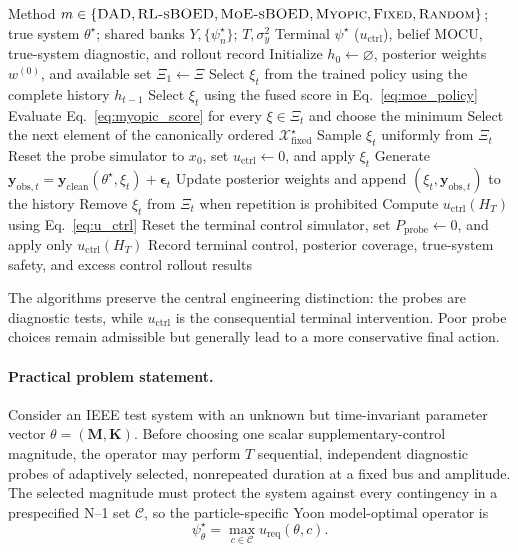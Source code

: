\documentclass[11pt]{article}
\begin{document}
\begin{algorithm}[htbp]
\caption{Unified rollout and evaluation for all six methods}
\label{alg:evaluation}
\begin{algorithmic}[1]
\Require Method \(m\in\{\textsc{DAD},\textsc{RL-sBOED},\textsc{MoE-sBOED},\textsc{Myopic},\textsc{Fixed},\textsc{Random}\}\); true system \(\theta^\star\); shared banks \(Y,\{\psi_n^\star\}\); \(T,\sigma_y^2\)
\Ensure Terminal \(\psi^\star\) (\(u_{\mathrm{ctrl}}\)), belief MOCU, true-system diagnostic, and rollout record
\State Initialize \(h_0\gets\varnothing\), posterior weights \(w^{(0)}\), and available set \(\Xi_1\gets\Xi\)
        \State Select \(\xi_t\) from the trained policy using the complete history \(h_{t-1}\)
        \State Select \(\xi_t\) using the fused score in Eq.~\eqref{eq:moe_policy}
        \State Evaluate Eq.~\eqref{eq:myopic_score} for every \(\xi\in\Xi_t\) and choose the minimum
        \State Select the next element of the canonically ordered \(\mathcal X_{\mathrm{fixed}}^{\star}\)
    \Else
        \State Sample \(\xi_t\) uniformly from \(\Xi_t\)
    \EndIf
    \State Reset the probe simulator to \(x_0\), set \(u_{\mathrm{ctrl}}\gets0\), and apply \(\xi_t\)
    \State Generate \(\mathbf y_{\mathrm{obs},t}=\mathbf y_{\mathrm{clean}}(\theta^\star,\xi_t)+\boldsymbol\epsilon_t\)
    \State Update posterior weights and append \((\xi_t,\mathbf y_{\mathrm{obs},t})\) to the history
    \State Remove \(\xi_t\) from \(\Xi_t\) when repetition is prohibited
\EndFor
\State Compute \(u_{\mathrm{ctrl}}(H_T)\) using Eq.~\eqref{eq:u_ctrl}
\State Reset the terminal control simulator, set \(P_{\mathrm{probe}}\gets0\), and apply only \(u_{\mathrm{ctrl}}(H_T)\)
\State Record terminal control, posterior coverage, true-system safety, and excess control
\State \Return rollout results
\end{algorithmic}
\end{algorithm}

The algorithms preserve the central engineering distinction: the probes are diagnostic tests, while \(u_{\mathrm{ctrl}}\) is the consequential terminal intervention. Poor probe choices remain admissible but generally lead to a more conservative final action.

\paragraph{Practical problem statement.}
Consider an IEEE test system with an unknown but time-invariant parameter
vector \(\theta=(\mathbf M,\mathbf K)\). Before choosing one scalar
supplementary-control magnitude, the operator may perform \(T\) sequential,
independent diagnostic probes of adaptively selected, nonrepeated duration at a
fixed bus and amplitude. The selected magnitude must protect the system
against every contingency in a prespecified N--1 set \(\mathcal C\), so the
particle-specific Yoon model-optimal operator is
\[
\psi_\theta^\star=\max_{c\in\mathcal C}u_{\mathrm{req}}(\theta,c).
\]
\end{document}
